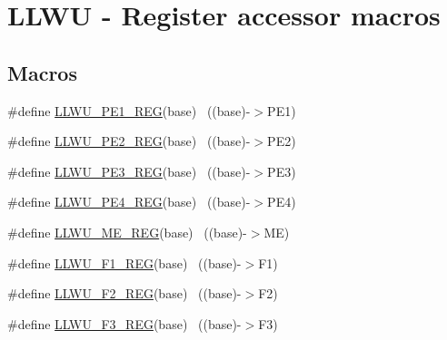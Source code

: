 \hypertarget{group___l_l_w_u___register___accessor___macros}{}\section{L\+L\+WU -\/ Register accessor macros}
\label{group___l_l_w_u___register___accessor___macros}
\subsection*{Macros}
\begin{DoxyCompactItemize}
\item 
\#define \hyperlink{group___l_l_w_u___register___accessor___macros_gada86612bb2a3cb6d479429beaca258a8}{L\+L\+W\+U\+\_\+\+P\+E1\+\_\+\+R\+EG}(base)                                          ~((base)-\/$>$P\+E1)
\item 
\#define \hyperlink{group___l_l_w_u___register___accessor___macros_ga13e23bebded99c5538c165fec2ffa41f}{L\+L\+W\+U\+\_\+\+P\+E2\+\_\+\+R\+EG}(base)                                          ~((base)-\/$>$P\+E2)
\item 
\#define \hyperlink{group___l_l_w_u___register___accessor___macros_ga0b72bd64b08303c30d4de21aa8bb06b8}{L\+L\+W\+U\+\_\+\+P\+E3\+\_\+\+R\+EG}(base)                                          ~((base)-\/$>$P\+E3)
\item 
\#define \hyperlink{group___l_l_w_u___register___accessor___macros_gaff14d2acccbae996be61c4ba7893024f}{L\+L\+W\+U\+\_\+\+P\+E4\+\_\+\+R\+EG}(base)                                          ~((base)-\/$>$P\+E4)
\item 
\#define \hyperlink{group___l_l_w_u___register___accessor___macros_gad2163c47741ae9561ed0cf28003dc06d}{L\+L\+W\+U\+\_\+\+M\+E\+\_\+\+R\+EG}(base)                                            ~((base)-\/$>$ME)
\item 
\#define \hyperlink{group___l_l_w_u___register___accessor___macros_ga3f4c680add377053731e36faf88c85c2}{L\+L\+W\+U\+\_\+\+F1\+\_\+\+R\+EG}(base)                                            ~((base)-\/$>$F1)
\item 
\#define \hyperlink{group___l_l_w_u___register___accessor___macros_ga9824713b71d34e05dd1783c6e0153a3c}{L\+L\+W\+U\+\_\+\+F2\+\_\+\+R\+EG}(base)                                            ~((base)-\/$>$F2)
\item 
\#define \hyperlink{group___l_l_w_u___register___accessor___macros_ga8369b30780db4c76aa70c8adf1a763fa}{L\+L\+W\+U\+\_\+\+F3\+\_\+\+R\+EG}(base)                                            ~((base)-\/$>$F3)

\end{DoxyCompactItemize}
